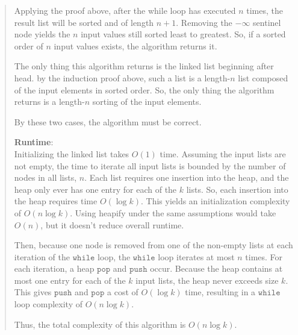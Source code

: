 \documentclass[11pt]{article}
\newcommand{\code}[1]{$\texttt{#1}$}
\begin{document}
\begin{enumerate}
\begin{enumerate}
\begin{quote}
  \medskip
  Applying the proof above, after the while loop has executed $n$ times, the result list will be sorted and of length $n + 1$. Removing the $-\infty$ sentinel node yields the $n$ input values still sorted least to greatest. So, if a sorted order of $n$ input values exists, the algorithm returns it.

  \medskip
  The only thing this algorithm returns is the linked list beginning after head. by the induction proof above, such a list is a length-$n$ list composed of the input elements in sorted order. So, the only thing the algorithm returns is a length-$n$ sorting of the input elements. 

  \medskip
  By these two cases, the algorithm must be correct.

  \textbf{Runtime}: \\ 
  Initializing the linked list takes $O(1)$ time. Assuming the input lists are not empty, the time to iterate all input lists is bounded by the number of nodes in all lists, $n$. Each list requires one insertion into the heap, and the heap only ever has one entry for each of the $k$ lists. So, each insertion into the heap requires time $O(\log k)$. This yields an initialization complexity of $O(n \log k)$. Using heapify under the same assumptions would take $O(n)$, but it doesn't reduce overall runtime. 

  \medskip
  Then, because one node is removed from one of the non-empty lists at each iteration of the \code{while} loop, the \code{while} loop iterates at most $n$ times. For each iteration, a heap \code{pop} and \code{push} occur. Because the heap contains at most one entry for each of the $k$ input lists, the heap never exceeds size $k$. This gives \code{push} and \code{pop} a cost of $O(\log k)$ time, resulting in a \code{while} loop complexity of $O(n \log k)$. 

  \medskip
  Thus, the total complexity of this algorithm is $O(n \log k)$.
  

\end{quote}
\end{enumerate}
\end{enumerate}
\end{document}
